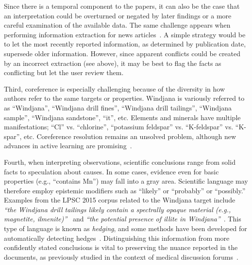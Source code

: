 \documentclass[letterpaper]{article}
\begin{document}
Since there is a temporal component to the papers, it can also be the
case that an interpretation could be overturned or negated by later
findings or a more careful examination of the available data.  The
same challenge appears when performing information extraction for 
news articles~\cite{mckeown:news95,ji:infofusion10}.
%
A simple strategy would be to let the most recently reported
information, as determined by publication date, supersede older
information.  However, since apparent conflicts could be created by an
incorrect extraction (see above), it may be best to flag the facts as
conflicting but let the user review them. 

Third, coreference is especially challenging because of the diversity
in how authors refer to the same targets or properties.  Windjana is
variously referred to as ``Windjana'', ``Windjana drill fines'',
``Windjana drill tailings'', ``Windjana sample'', ``Windjana
sandstone'', ``it'', etc.  Elements and minerals have multiple
manifestations; ``Cl'' vs. ``chlorine'', ``potassium feldspar''
vs. ``K-feldspar'' vs. ``K-spar'', etc.  Coreference resolution
remains an unsolved problem, although new advances in active learning
are promising~\cite{sachan:coref15}.

Fourth, when interpreting observations, scientific conclusions range
from solid facts to speculation about causes.  In some cases, evidence
even for basic properties (e.g., ``contains Mn'') may fall into a gray
area.  Scientific language may therefore employ epistemic modifiers
such as ``likely'' or ``probably'' or ``possibly.''  Examples from the
LPSC 2015 corpus related to the Windjana target include {\em ``the
Windjana drill tailings likely contain a spectrally opaque material
(e.g., magnetite, ilmenite)''}~\cite{johnson:ferric15} and {\em ``the
potential presence of illite in Windjana''}~\cite{rampe:cement15}.
This type of language is known as {\em hedging}, and some methods have
been developed for automatically detecting
hedges~\cite{medlock:hedge07,agarwal:hedge10}.  
Distinguishing this information from more confidently stated
conclusions is vital to preserving the nuance reported in the
documents, as previously studied in the context of medical discussion
forums~\cite{sokolova:epistemic13}.
%
\end{document}
